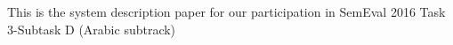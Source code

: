 This is the system description paper for our participation in SemEval 2016 Task 3-Subtask D (Arabic subtrack)
